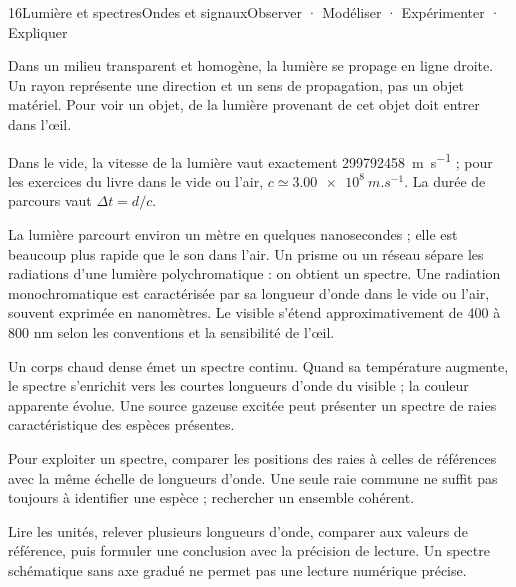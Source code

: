 \begin{ouverture}[spectre]{16}{Lumière et spectres}{Ondes et signaux}{Observer · Modéliser · Expérimenter · Expliquer}
\end{ouverture}
\essentiel
{}
Dans un milieu transparent et homogène, la lumière se propage en ligne droite. Un rayon représente une direction et un sens de propagation, pas un objet matériel. Pour voir un objet, de la lumière provenant de cet objet doit entrer dans l'œil.
\begin{definition}[Vitesse]Dans le vide, la vitesse de la lumière vaut exactement \qty{299792458}{m.s^{-1}} ; pour les exercices du livre dans le vide ou l'air, $c\simeq\qty{3,00e8}{m.s^{-1}}$. La durée de parcours vaut $\Delta t=d/c$.\end{definition}
La lumière parcourt environ un mètre en quelques nanosecondes ; elle est beaucoup plus rapide que le son dans l'air.
Un prisme ou un réseau sépare les radiations d'une lumière polychromatique : on obtient un spectre. Une radiation monochromatique est caractérisée par sa longueur d'onde dans le vide ou l'air, souvent exprimée en nanomètres. Le visible s'étend approximativement de 400 à 800 nm selon les conventions et la sensibilité de l'œil.
\begin{propriete}Un corps chaud dense émet un spectre continu. Quand sa température augmente, le spectre s'enrichit vers les courtes longueurs d'onde du visible ; la couleur apparente évolue. Une source gazeuse excitée peut présenter un spectre de raies caractéristique des espèces présentes.\end{propriete}
Pour exploiter un spectre, comparer les positions des raies à celles de références avec la même échelle de longueurs d'onde. Une seule raie commune ne suffit pas toujours à identifier une espèce ; rechercher un ensemble cohérent.
\begin{savoirfaire}[Méthode]Lire les unités, relever plusieurs longueurs d'onde, comparer aux valeurs de référence, puis formuler une conclusion avec la précision de lecture. Un spectre schématique sans axe gradué ne permet pas une lecture numérique précise.\end{savoirfaire}
